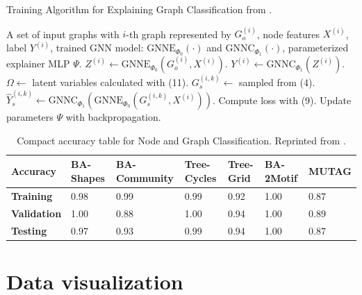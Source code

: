     \begin{algorithm}
    \caption{Training Algorithm for Explaining Graph Classification from \cite{luo2020parameterized}.}
    \label{alg:graph-alg}
    \begin{algorithmic}[1]
    \REQUIRE A set of input graphs with $i$-th graph represented by $G^{(i)}_o$, node features $X^{(i)}$, label $Y^{(i)}$, trained GNN model: $\text{GNNE}_{\Phi_0}(\cdot)$ and $\text{GNNC}_{\Phi_1}(\cdot)$, parameterized explainer MLP $\Psi$.
        \STATE $Z^{(i)} \leftarrow \text{GNNE}_{\Phi_0}(G^{(i)}_o, X^{(i)})$.
        \STATE $Y^{(i)} \leftarrow \text{GNNC}_{\Phi_1}(Z^{(i)})$.
    \ENDFOR
            \STATE $\Omega \leftarrow$ latent variables calculated with (11).
                \STATE $G^{(i,k)}_s \leftarrow$ sampled from (4).
                \STATE $\hat{Y}^{(i,k)}_s \leftarrow \text{GNNC}_{\Phi_1}(\text{GNNE}_{\Phi_0}(G^{(i,k)}_s, X^{(i)}))$.
            \ENDFOR
        \ENDFOR
        \STATE Compute loss with (9).
        \STATE Update parameters $\Psi$ with backpropagation.
    \ENDFOR
    \end{algorithmic}
\end{algorithm}

\begin{table}[h]
    \centering
    \scriptsize
    \begin{tabularx}{\linewidth}{l|X X X X|X X}
    \hline
    \textbf{Accuracy} & \textbf{BA-Shapes} & \textbf{BA-Community} & \textbf{Tree-Cycles} & \textbf{Tree-Grid} & \textbf{BA-2Motif} & \textbf{MUTAG} \\
    \hline
    \textbf{Training}   & 0.98 & 0.99 & 0.99 & 0.92 & 1.00 & 0.87 \\
    \textbf{Validation} & 1.00 & 0.88 & 1.00 & 0.94 & 1.00 & 0.89 \\
    \textbf{Testing}    & 0.97 & 0.93 & 0.99 & 0.94 & 1.00 & 0.87 \\
    \hline
    \end{tabularx}
    \caption[Accuracies of original GNN downstream task]{Compact accuracy table for Node and Graph Classification. Reprinted from \cite{luo2020parameterized}.}
    \label{tab:compact-accuracy}
\end{table}


\section{Data visualization}
\label{sec:data_vis}

